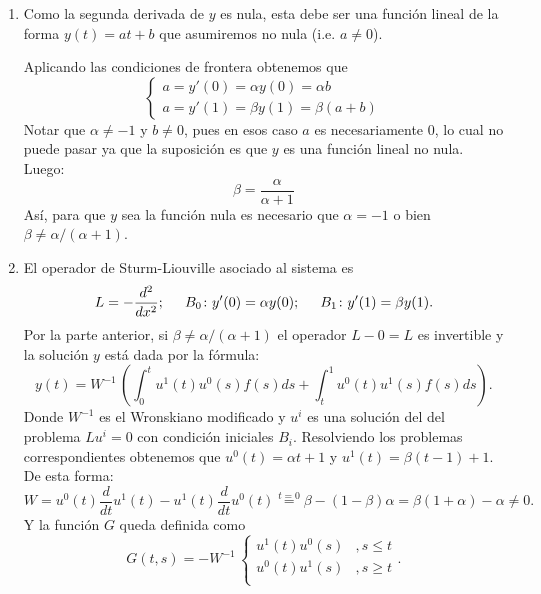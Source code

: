 \begin{enumerate}[leftmargin=1em,itemsep=.5em]
	\item %
	Como la segunda derivada de \(y\) es nula, esta debe ser una función lineal
	de la forma \(y(t) = at + b\) que asumiremos no nula (i.e. \(a\ne 0\)).

	Aplicando las condiciones de frontera obtenemos que
	\[
		\begin{cases}
			a = y'(0) = \alpha y(0) = \alpha b\\
			a = y'(1) = \beta y(1) = \beta (a+b)
		\end{cases}
	\]
	Notar que \(\alpha \ne -1\) y \(b\ne 0\), pues en esos caso \(a\) es
	necesariamente \(0\), lo cual no puede pasar ya que la suposición es que
	\(y\) es una función lineal no nula. Luego:
	\[
		\beta = \frac{\alpha}{\alpha+1}
	\]
	Así, para que \(y\) sea la función nula es necesario que \(\alpha = -1\) o
	bien \(\beta \ne \alpha/(\alpha+1)\).

	\item %
	El operador de Sturm-Liouville asociado al sistema es
	\[
		L = -\frac{d^2}{dx^2}; \hspace{.5cm}
		B_0 \colon y'(0) = \alpha y(0); \hspace{.5cm}
		B_1 \colon y'(1) = \beta y(1)
	.\]
	Por la parte anterior, si \(\beta \ne \alpha/(\alpha+1)\) el operador \(L-0 = L\)
	es invertible y la solución \(y\) está dada por la fórmula:
	\[
		y(t)
		=
		W^{-1}\, \left(
		\int_{0}^{t} u^{1}(t) u^{0}(s) f(s) ds
		+
		\int_{t}^{1} u^{0}(t) u^{1}(s) f(s) ds
		\right)
	.\]
	Donde \(W^{-1}\) es el Wronskiano modificado y \(u^{i}\) es una solución del
	del problema \(Lu^{i} = 0\) con condición iniciales \(B_i\).
	Resolviendo los problemas correspondientes obtenemos que \(u^{0}(t) = \alpha t + 1\) y \(u^{1}(t)
	= \beta (t-1) + 1\). De esta forma:
	\[
		W
		=
		u^{0}(t) \frac{d}{dt} u^{1}(t) - u^{1}(t) \frac{d}{dt} u^{0}(t)
		\overset{t=0}{=}
		\beta - (1-\beta)\alpha
		=
		\beta (1+\alpha) - \alpha
		\ne 0
	.\]
	Y la función \(G\) queda definida como
	\[
		G(t,s) = -W^{-1}\,
		\begin{cases}
			u^{1}(t) u^{0}(s) &, s \le t\\
			u^{0}(t) u^{1}(s) &, s \ge t\\
		\end{cases}
	.\]
\end{enumerate}

